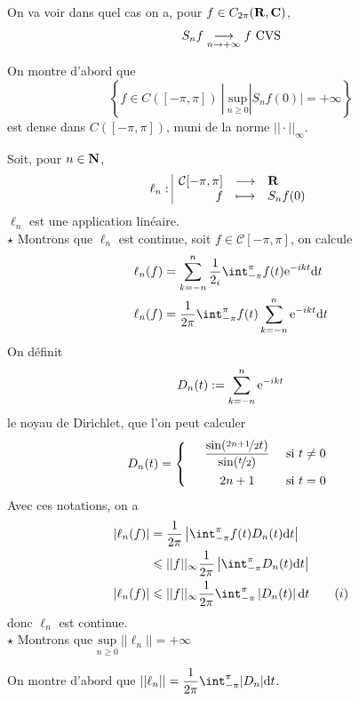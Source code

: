 \documentclass[a4paper,11pt, twoside]{article}
\begin{document}
On va voir dans quel cas on a, pour $f\in C_{2\pi}(\mathbf R,\mathbf C)$,
$$S_nf\underset{n\to+\infty}{\longrightarrow} f\text{ CVS}$$

On montre d'abord que 
$$\left\{f\in C([-\pi,\pi])\ |\ \underset{n\geqslant 0}{\mathrm{sup}}|S_nf(0)|=+\infty\right\}$$
est dense dans $C([-\pi,\pi])$, muni de la norme $||\cdot||_{\infty}$.

\begin{Proof}
  Soit, pour $n\in \mathbf N$, 
  $$\ell_n: 
  \begin{array}{|rcl}
    \mathcal C[-\pi,\pi]&\longrightarrow&\mathbf R\\
    f&\longmapsto&S_nf(0)\\
  \end{array}$$
  $\ell_n$ est une application linéaire.\\

  $\star$ Montrons que $\ell_n$ est continue, soit $f\in\mathcal C[-\pi,\pi]$, on calcule 
  \begin{align*}
    \ell_n(f)&=\sum_{k=-n}^n\frac{1}{2_i}\int_{-\pi}^{\pi}f(t)\ex{-ikt}\dt\\
    \ell_n(f)&=\frac{1}{2\pi}\int_{-\pi}^{\pi}f(t)\sum_{k=-n}^n\ex{-ikt}\dt
  \end{align*}
  On définit 
  $$D_n(t):=\sum_{k=-n}^n\mathrm{e}^{-ikt}$$
  le noyau de Dirichlet, que l'on peut calculer
  $$D_n(t)=\left\{\begin{array}{rcr}
    &\displaystyle\frac{\sin(\nicefrac{2n+1}{2}t)}{\sin(\nicefrac{t}{2})}&\text{ si }t\neq 0\\[1em]
    & 2n+1&\text{ si }t=0  
  \end{array}\right.$$
  Avec ces notations, on a 
  \begin{align*}
    |\ell_n(f)|&=\frac{1}{2\pi}\left|\int_{-\pi}^{\pi}f(t)D_n(t)\dt\right|\\
    &\leqslant ||f||_{\infty}\frac{1}{2\pi}\left|\int_{-\pi}^{\pi}D_n(t)\dt\right|\\
    |\ell_n(f)|&\leqslant ||f||_{\infty}\frac{1}{2\pi}\int_{-\pi}^{\pi}\left|D_n(t)\right|\dt\qquad (i)
  \end{align*}
  donc $\ell_n$ est continue.\\

  $\star$ Montrons que $\underset{n\geqslant 0}{\mathrm{sup}}\ ||\ell_n||=+\infty$

  On montre d'abord que $||\ell_n||=\dstyle\frac{1}{2\pi}\int_{-\pi}^{\pi}|D_n|\dt$. 
  

\end{Proof}
\end{document}
